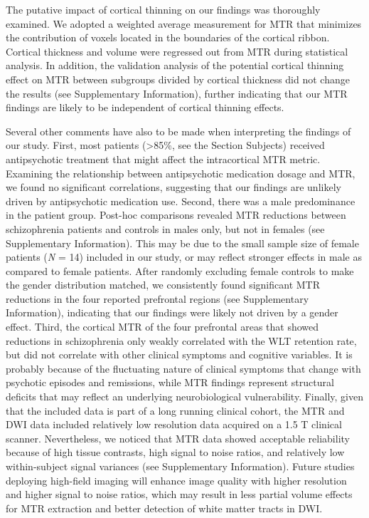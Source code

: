 \begin{refsection}
The putative impact of cortical thinning \citep{Goldman2009WidespreadRO,Haren2011ChangesIC} on our findings was thoroughly examined. We adopted a weighted average measurement for MTR that minimizes the contribution of voxels located in the boundaries of the cortical ribbon. Cortical thickness and volume were regressed out from MTR during statistical analysis. In addition, the validation analysis of the potential cortical thinning effect on MTR between subgroups divided by cortical thickness did not change the results (see Supplementary Information), further indicating that our MTR findings are likely to be independent of cortical thinning effects.

Several other comments have also to be made when interpreting the findings of our study. First, most patients (>85\%, see the Section Subjects) received antipsychotic treatment that might affect the intracortical MTR metric. Examining the relationship between antipsychotic medication dosage and MTR, we found no significant correlations, suggesting that our findings are unlikely driven by antipsychotic medication use. Second, there was a male predominance in the patient group. Post-hoc comparisons revealed MTR reductions between schizophrenia patients and controls in males only, but not in females (see Supplementary Information). This may be due to the small sample size of female patients (\textit{N} = 14) included in our study, or may reflect stronger effects in male as compared to female patients. After randomly excluding female controls to make the gender distribution matched, we consistently found significant MTR reductions in the four reported prefrontal regions (see Supplementary Information), indicating that our findings were likely not driven by a gender effect. Third, the cortical MTR of the four prefrontal areas that showed reductions in schizophrenia only weakly correlated with the WLT retention rate, but did not correlate with other clinical symptoms and cognitive variables. It is probably because of the fluctuating nature of clinical symptoms that change with psychotic episodes and remissions, while MTR findings represent structural deficits that may reflect an underlying neurobiological vulnerability. Finally, given that the included data is part of a long running clinical cohort, the MTR and DWI data included relatively low resolution data acquired on a 1.5 T clinical scanner. Nevertheless, we noticed that MTR data showed acceptable reliability because of high tissue contrasts, high signal to noise ratios, and relatively low within-subject signal variances (see Supplementary Information). Future studies deploying high-field imaging will enhance image quality with higher resolution and higher signal to noise ratios, which may result in less partial volume effects for MTR extraction and better detection of white matter tracts in DWI.


\end{refsection}
